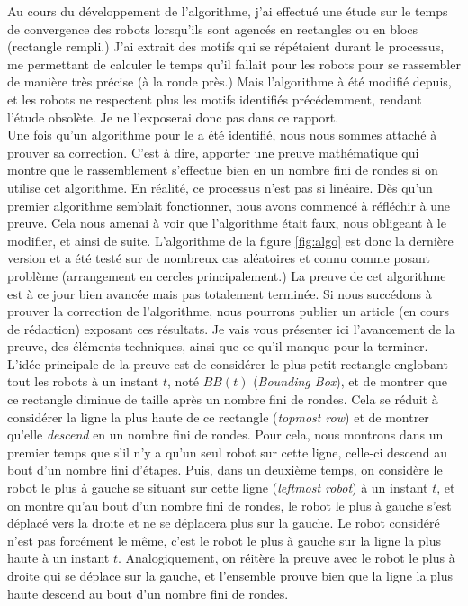

Au cours du développement de l'algorithme, j'ai effectué une étude sur le temps
de convergence des robots lorsqu'ils sont agencés en rectangles ou en blocs
(rectangle rempli.) J'ai extrait des motifs qui se répétaient durant le
processus, me permettant de calculer le temps qu'il fallait pour les robots
pour se rassembler de manière très précise (à la ronde près.) Mais l'algorithme
à été modifié depuis, et les robots ne respectent plus les motifs identifiés
précédemment, rendant l'étude obsolète. Je ne l'exposerai donc pas dans ce
rapport. \\

Une fois qu'un algorithme pour le \GatheringProblem a été identifié, nous nous
sommes attaché à prouver sa correction. C'est à dire, apporter une preuve
mathématique qui montre que le rassemblement s'effectue bien en un nombre fini
de rondes si on utilise cet algorithme. En réalité, ce processus n'est pas si
linéaire. Dès qu'un premier algorithme semblait fonctionner, nous avons
commencé à réfléchir à une preuve. Cela nous amenai à voir que l'algorithme
était faux, nous obligeant à le modifier, et ainsi de suite. L'algorithme de la
figure \ref{fig:algo} est donc la dernière version et a été testé sur de
nombreux cas aléatoires et connu comme posant problème (arrangement en cercles
principalement.) La preuve de cet algorithme est à ce jour bien avancée mais
pas totalement terminée. Si nous succédons à prouver la correction de
l'algorithme, nous pourrons publier un article (en cours de rédaction) exposant
ces résultats. Je vais vous présenter ici l'avancement de la preuve, des
éléments techniques, ainsi que ce qu'il manque pour la terminer. \\

L'idée principale de la preuve est de considérer le plus petit rectangle
englobant tout les robots à un instant $t$, noté $BB(t)$ (\textit{Bounding
Box}), et de montrer que ce rectangle diminue de taille après un nombre fini de
rondes. Cela se réduit à considérer la ligne la plus haute de ce rectangle
(\textit{topmost row}) et de montrer qu'elle \textit{descend} en un nombre fini
de rondes. Pour cela, nous montrons dans un premier temps que s'il n'y a qu'un
seul robot sur cette ligne, celle-ci descend au bout d'un nombre fini d'étapes.
Puis, dans un deuxième temps, on considère le robot le plus à gauche se situant
sur cette ligne (\textit{leftmost robot}) à un instant $t$, et on montre qu'au
bout d'un nombre fini de rondes, le robot le plus à gauche s'est déplacé vers
la droite et ne se déplacera plus sur la gauche. Le robot considéré n'est pas
forcément le même, c'est le robot le plus à gauche sur la ligne la plus haute à
un instant $t$. Analogiquement, on réitère la preuve avec le robot le plus à
droite qui se déplace sur la gauche, et l'ensemble prouve bien que la ligne la
plus haute descend au bout d'un nombre fini de rondes. \\

